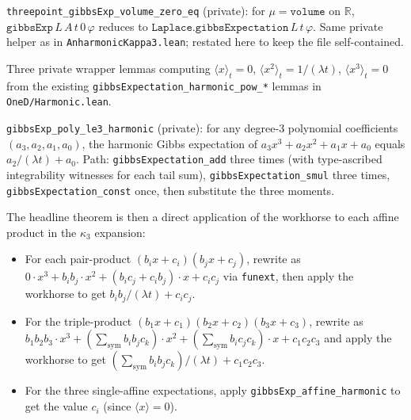 \documentclass[11pt]{article}
\begin{document}
\begin{description}[leftmargin=2em]
\item[Bridge.] \texttt{threepoint\_gibbsExp\_volume\_zero\_eq}
(private): for $\mu = \texttt{volume}$ on $\mathbb{R}$,
$\texttt{gibbsExp}\,L\,A\,t\,0\,\varphi$ reduces to
$\texttt{Laplace.gibbsExpectation}\,L\,t\,\varphi$. Same private
helper as in \texttt{AnharmonicKappa3.lean}; restated here to keep
the file self-contained.

\item[Moment closed forms.] Three private wrapper lemmas computing
$\langle x \rangle_t = 0$, $\langle x^2 \rangle_t = 1/(\lambda t)$,
$\langle x^3 \rangle_t = 0$ from the existing
\texttt{gibbsExpectation\_harmonic\_pow\_*} lemmas in
\texttt{OneD/Harmonic.lean}.

\item[Polynomial-expectation workhorse.]
\texttt{gibbsExp\_poly\_le3\_harmonic} (private): for any degree-3
polynomial coefficients $(a_3, a_2, a_1, a_0)$, the harmonic Gibbs
expectation of $a_3 x^3 + a_2 x^2 + a_1 x + a_0$ equals
$a_2 / (\lambda t) + a_0$. Path: \texttt{gibbsExpectation\_add} three
times (with type-ascribed integrability witnesses for each tail
sum), \texttt{gibbsExpectation\_smul} three times,
\texttt{gibbsExpectation\_const} once, then substitute the three
moments.
\end{description}

\noindent
The headline theorem is then a direct application of the workhorse
to each affine product in the $\kappa_3$ expansion:
\begin{itemize}[leftmargin=2em]
\item For each pair-product $(b_i x + c_i)(b_j x + c_j)$, rewrite
as $0 \cdot x^3 + b_i b_j \cdot x^2 + (b_i c_j + c_i b_j) \cdot x +
c_i c_j$ via \texttt{funext}, then apply the workhorse to get
$b_i b_j / (\lambda t) + c_i c_j$.

\item For the triple-product
$(b_1 x + c_1)(b_2 x + c_2)(b_3 x + c_3)$, rewrite as
$b_1 b_2 b_3 \cdot x^3 + (\sum_{\mathrm{sym}} b_i b_j c_k) \cdot x^2 +
(\sum_{\mathrm{sym}} b_i c_j c_k) \cdot x + c_1 c_2 c_3$ and apply
the workhorse to get
$(\sum_{\mathrm{sym}} b_i b_j c_k) / (\lambda t) + c_1 c_2 c_3$.

\item For the three single-affine expectations, apply
\texttt{gibbsExp\_affine\_harmonic} to get the value $c_i$ (since
$\langle x \rangle = 0$).
\end{itemize}
\end{document}

